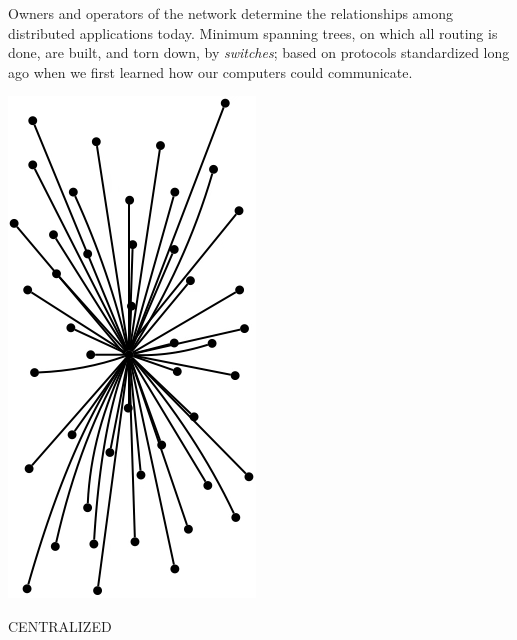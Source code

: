 \documentclass[../HFT-main.tex]{subfiles}
\begin{document}
\vspace{-15pt}


%


\begin{framed} 
\noindent Owners and operators of the network determine the relationships among distributed applications today. %
Minimum spanning trees, on which all routing is done, are built, and torn down, by \emph{switches}; based on protocols standardized long ago when we first learned how our computers could communicate. %
\end{framed}
\begin{marginfigure}
  \includegraphics[width=0.6\linewidth]{../figures/Baran-Centralized.png}
  \caption{CENTRALIZED}
  \vspace{12pt}
\end{marginfigure}
\end{document}
